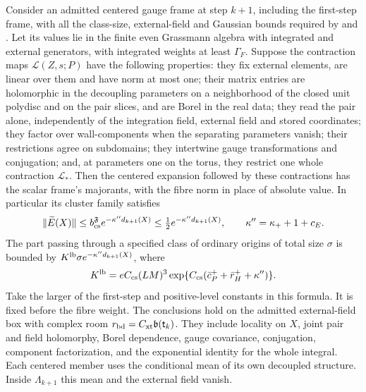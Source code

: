 \documentclass[11pt,letterpaper,reqno]{amsart}
\makeatletter
\theoremstyle{definition}
\newcommand{\ms@minorstart}{%
  \pushQED{\qed}\renewcommand{\qedsymbol}{$\blacksquare$}}
\newenvironment{lemma}[1][]{\ms@minorstart\ms@lemma[#1]}
  {\popQED\endms@lemma}
\theoremstyle{remark}
\makeatother
\begin{document}
\begin{lemma}[Local contractions in the centered expansion]
\label{C-399-41}
Consider an admitted centered gauge frame at step $k+1$,
including the first-step frame, with all the class-size,
external-field and Gaussian bounds required by
\cite[Prop.~5.19]{YMM1} and \cite[Prop.~5.20]{YMM1}.
Let its values lie in the finite even Grassmann algebra with
integrated and external generators, with integrated weights
at least $\Gamma_F$. Suppose the contraction maps
$\mathscr L(Z,s;P)$ have the following properties:
they fix external elements, are linear over them and have
norm at most one; their matrix entries are holomorphic in
the decoupling parameters on a neighborhood of the closed
unit polydisc and on the pair slices, and are Borel in the
real data; they read the pair alone, independently of the
integration field, external field and stored coordinates;
they factor over wall-components when the separating
parameters vanish; their restrictions agree on subdomains;
they intertwine gauge transformations and conjugation; and,
at parameters one on the torus, they restrict one whole
contraction $\mathscr L_*$. Then the centered expansion
followed by these contractions has the scalar frame's
majorants, with the fibre norm in place of absolute value.
In particular its cluster family satisfies
\[
 \|\widetilde E(X)\|
 \le b_{\rm cs}^{\mathfrak F}e^{-\kappa''d_{k+1}(X)}
 \le\tfrac12e^{-\kappa''d_{k+1}(X)},\qquad
 \kappa''=\kappa_++1+c_E.
\]
The part passing through a specified class of ordinary
origins of total size $\sigma$ is bounded by
$K^{\rm lb}\sigma e^{-\kappa''d_{k+1}(X)}$, where
\[
 K^{\rm lb}
 =eC_{\rm cs}(LM)^3
  \exp\{C_{\rm cs}(\bar c_P^++\bar r_H^++\kappa'')\}.
\]
Take the larger of the first-step and positive-level constants
in this formula. It is fixed before the fibre weight.
The conclusions hold on the admitted external-field box
with complex room $r_{\rm bd}=C_{\rm xt}\mathfrak b(\mathsf t_k)$.
They include locality on $X$, joint pair and field holomorphy,
Borel dependence, gauge covariance, conjugation, component
factorization, and the exponential identity for the whole
integral. Each centered member uses the conditional mean
of its own decoupled structure. Inside $\Lambda_{k+1}$
this mean and the external field vanish.
\end{lemma}
\end{document}
